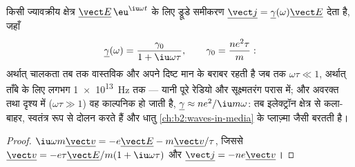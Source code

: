 \begin{proposition}[ऊँची आवृत्ति पर ओम का नियम]\label{prop:b2:charges-currents-conduction:acdrude}
किसी ज्यावक्रीय क्षेत्र $\underline{\vect E}\,\eu^{\iu\omega t}$ के लिए ड्रूडे समीकरण
$\underline{\vect j} = \underline\gamma(\omega)\underline{\vect E}$ देता है, जहाँ
\[
\underline\gamma(\omega) = \frac{\gamma_0}{1 + \iu\omega\tau} , \qquad \gamma_0 = \frac{ne^2\tau}{m} :
\]
अर्थात् चालकता तब तक वास्तविक और अपने दिष्ट मान के बराबर रहती है जब तक $\omega\tau
\ll 1$, अर्थात् ताँबे के लिए लगभग \qty{1e13}{Hz} तक --- यानी पूरे
रेडियो और सूक्ष्मतरंग परास में; और अवरक्त तथा दृश्य में ($\omega\tau \gg 1$)
वह काल्पनिक हो जाती है, $\underline\gamma \approx ne^2/\iu m\omega$: तब इलेक्ट्रॉन
क्षेत्र से कला-बाहर, स्वतंत्र रूप से दोलन करते हैं और धातु
\cref{ch:b2:waves-in-media} के प्लाज़्मा जैसी बरतती है।
\end{proposition}

\begin{proof}
$\iu\omega m\underline{\vect v} = -e\underline{\vect E} - m\underline{\vect v}/\tau$, जिससे
$\underline{\vect v} = -e\tau\underline{\vect E}/m(1 + \iu\omega\tau)$ और $\underline{\vect j}
= -ne\underline{\vect v}$।
\end{proof}

